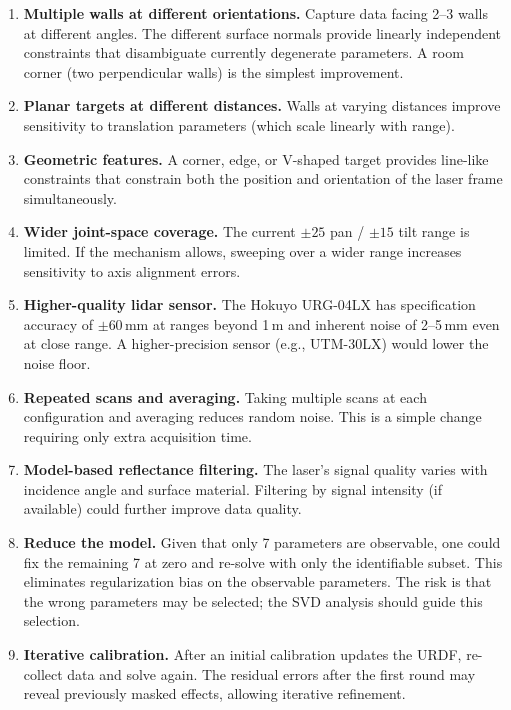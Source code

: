 \documentclass[12pt,a4paper]{article}
\begin{document}
\begin{enumerate}
    \item \textbf{Multiple walls at different orientations.}
          Capture data facing 2--3 walls at different angles. The
          different surface normals provide linearly independent
          constraints that disambiguate currently degenerate parameters.
          A room corner (two perpendicular walls) is the simplest
          improvement.

    \item \textbf{Planar targets at different distances.}
          Walls at varying distances improve sensitivity to translation
          parameters (which scale linearly with range).

    \item \textbf{Geometric features.}
          A corner, edge, or V-shaped target provides line-like
          constraints that constrain both the position and orientation
          of the laser frame simultaneously.

    \item \textbf{Wider joint-space coverage.}
          The current $\pm 25$\textdegree{} pan / $\pm 15$\textdegree{} tilt
          range is limited. If the mechanism allows, sweeping over a
          wider range increases sensitivity to axis alignment errors.

    \item \textbf{Higher-quality lidar sensor.}
          The Hokuyo URG-04LX has specification accuracy of $\pm 60$\,mm
          at ranges beyond 1\,m and inherent noise of 2--5\,mm even at close
          range. A higher-precision sensor (e.g., UTM-30LX) would lower
          the noise floor.

    \item \textbf{Repeated scans and averaging.}
          Taking multiple scans at each configuration and averaging
          reduces random noise. This is a simple change requiring only
          extra acquisition time.

    \item \textbf{Model-based reflectance filtering.}
          The laser's signal quality varies with incidence angle and
          surface material. Filtering by signal intensity (if available)
          could further improve data quality.

    \item \textbf{Reduce the model.}
          Given that only 7 parameters are observable, one could
          fix the remaining 7 at zero and re-solve with only the
          identifiable subset. This eliminates regularization bias
          on the observable parameters. The risk is that the wrong
          parameters may be selected; the SVD analysis should guide
          this selection.

    \item \textbf{Iterative calibration.}
          After an initial calibration updates the URDF, re-collect data
          and solve again. The residual errors after the first round may
          reveal previously masked effects, allowing iterative refinement.
\end{enumerate}
\end{document}
